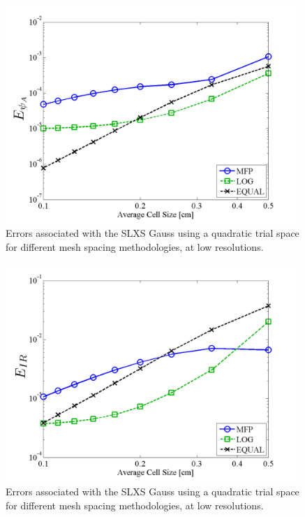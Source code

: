 \begin{figure}[!htp]
\centering
\includegraphics[width=11cm]{chapter3_variable_xs/LOW_RES_P2_GAUSS_E_PSI_A.png}
\caption{Errors associated with the SLXS Gauss using a quadratic trial space for different mesh spacing methodologies, at low resolutions.}
\label{fig:low_res_gauss_psi_A}
\end{figure}
%
\begin{figure}[!hbp]
\centering
\includegraphics[width=11cm]{chapter3_variable_xs/LOW_RES_P2_GAUSS_E_IR.png}
\caption{Errors associated with the SLXS Gauss using a quadratic trial space for different mesh spacing methodologies, at low resolutions.}
\label{fig:low_res_gauss_ir}
\end{figure}
%
